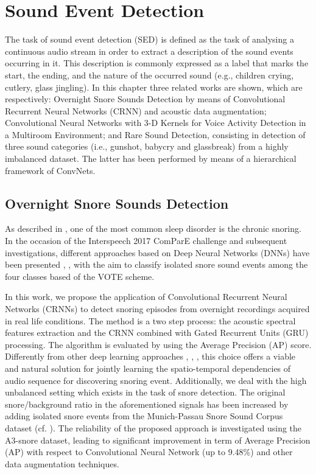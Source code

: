 \chapter{Sound Event Detection}
\label{ch:SED}

The task of sound event detection (SED) is defined as the task of analysing a continuous audio stream in order to extract a description of the sound events occurring in it. This description is commonly expressed as a label that marks the start, the ending, and the nature of the occurred sound (e.g., children crying, cutlery, glass jingling). In this chapter three related works are shown, which are respectively: Overnight Snore Sounds Detection by means of Convolutional Recurrent Neural Networks (CRNN) and acoustic data augmentation; Convolutional Neural Networks with 3-D Kernels for Voice Activity Detection in a Multiroom Environment; and Rare Sound Detection, consisting in detection of three sound categories (i.e., gunshot, babycry and glassbreak) from a highly imbalanced dataset. The latter has been performed by means of a hierarchical framework of ConvNets.

\section{Overnight Snore Sounds Detection}
\label{sec:snoring_detection}
As described in , one of the most common sleep disorder is the chronic snoring. In the occasion of the Interspeech 2017 ComParE challenge \cite{ComParE2017} and subsequent investigations, different approaches based on Deep Neural Networks (DNNs) have been presented \cite{amiriparian2017snore}, \cite{freitag2017end}, \cite{vesperini2018snore} with the aim to classify isolated snore sound events among the four classes based of the VOTE scheme.

In this work, we propose the application of Convolutional Recurrent Neural Networks (CRNNs) to detect snoring episodes from overnight recordings acquired in real life conditions. The method is a two step process: the acoustic spectral features extraction and the CRNN combined with Gated Recurrent Units (GRU) processing. The algorithm is evaluated by using the Average Precision (AP) score.
Differently from other deep learning approaches \cite{amiriparian2017snore}, \cite{freitag2017end}, \cite{vesperini2018snore}, this choice offers a viable and natural solution for jointly learning the spatio-temporal dependencies of audio sequence for discovering snoring event. Additionally, we deal with the high unbalanced setting which exists in the task of snore detection. The original snore/background ratio in the aforementioned signals has been increased by adding isolated snore events from the Munich-Passau Snore Sound Corpus dataset \cite{ComParE2017} (cf. ). The reliability of the proposed approach is investigated using the A3-snore dataset, leading to significant improvement in term of Average Precision (AP) with respect to Convolutional Neural Network (up to 9.48\%) and other data augmentation techniques.


